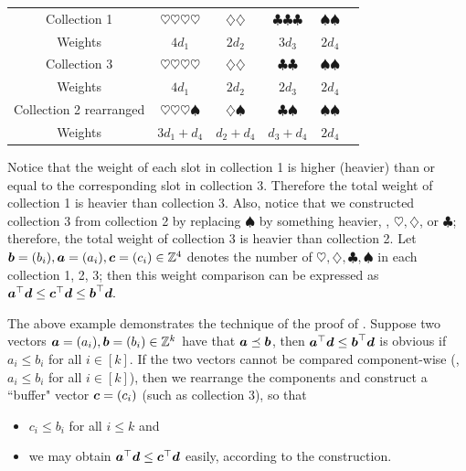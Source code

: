 \documentclass[runningheads]{llncs}
\begin{document}
\begin{example}
\begin{center}
\begin{tabular}{c|c|c|c|c|c}
    Collection 1 & $\heartsuit\heartsuit\heartsuit\heartsuit$ & $\diamondsuit\diamondsuit$ & $\clubsuit\clubsuit\clubsuit$ & $\spadesuit\spadesuit$ & \\
    Weights & $4d_1$ & $2d_2$ & $3d_3$ & $2d_4$ & \\\hline
    Collection 3 & $\heartsuit\heartsuit\heartsuit\heartsuit$ & $\diamondsuit\diamondsuit$ & $\clubsuit\clubsuit$ & $\spadesuit\spadesuit$ & \\
    Weights & $4d_1$ & $2d_2$ & $2d_3$ & $2d_4$ & \\\hline
    Collection 2 rearranged & $\heartsuit\heartsuit\heartsuit\spadesuit$ & $\diamondsuit\spadesuit$ & $\clubsuit\spadesuit$ & $\spadesuit\spadesuit$ & \\
    Weights & $3d_1 + d_4$ & $d_2 + d_4$ & $d_3+d_4$ & $2d_4$ & \\
\end{tabular}
\end{center}
Notice that the weight of each slot in collection 1 is higher (heavier) than or equal to the corresponding slot in collection 3. 
Therefore the total weight of collection 1 is heavier than collection 3. 
Also, notice that we constructed collection 3 from collection 2 by replacing $\spadesuit$ by something heavier, \ie, $\heartsuit, \diamondsuit$, or $\clubsuit$; therefore, the total weight of collection 3 is heavier than collection 2. 
Let $\boldsymbol b = (b_i), \boldsymbol a = (a_i), \boldsymbol c = (c_i)\in\mathbb Z^4$ denotes the number of $\heartsuit,\diamondsuit,\clubsuit,\spadesuit$ in each collection 1, 2, 3; then this weight comparison can be expressed as $\boldsymbol a^\top\boldsymbol d\leq\boldsymbol c^\top\boldsymbol d\leq\boldsymbol b^\top\boldsymbol d.$
\end{example}

The above example demonstrates the technique of the proof of .
Suppose two vectors $\boldsymbol a = (a_i), \boldsymbol b=(b_i)\in\mathbb Z^k$ have that $\boldsymbol a\preceq\boldsymbol b$, then $\boldsymbol a^\top\boldsymbol d\leq\boldsymbol b^\top\boldsymbol d$ is obvious if $a_i\leq b_i$ for all $i\in[k]$. 
If the two vectors cannot be compared component-wise (\ie, $a_i\leq b_i$ for all $i\in[k]$), then we rearrange the components and construct a ``buffer" vector $\boldsymbol c=(c_i)$ (such as collection 3), so that
\begin{itemize}
    \item $c_i\leq b_i$ for all $i\leq k$ and
    \item we may obtain $\boldsymbol a^\top\boldsymbol d\leq \boldsymbol c^\top\boldsymbol d$ easily, according to the construction.
\end{itemize}
\end{document}
